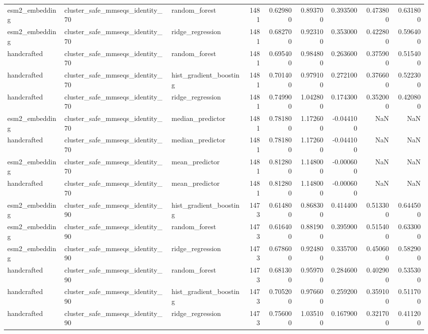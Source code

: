 \begin{longtable}{lllrrrrrr}
esm2\_embedding & cluster\_safe\_mmseqs\_identity\_70 & random\_forest & 1481 & 0.629800 & 0.893700 & 0.393500 & 0.473800 & 0.631800 \\
esm2\_embedding & cluster\_safe\_mmseqs\_identity\_70 & ridge\_regression & 1481 & 0.682700 & 0.923100 & 0.353000 & 0.422800 & 0.596400 \\
handcrafted & cluster\_safe\_mmseqs\_identity\_70 & random\_forest & 1481 & 0.695400 & 0.984800 & 0.263600 & 0.375900 & 0.515400 \\
handcrafted & cluster\_safe\_mmseqs\_identity\_70 & hist\_gradient\_boosting & 1481 & 0.701400 & 0.979100 & 0.272100 & 0.376600 & 0.522300 \\
handcrafted & cluster\_safe\_mmseqs\_identity\_70 & ridge\_regression & 1481 & 0.749900 & 1.042800 & 0.174300 & 0.352000 & 0.420800 \\
esm2\_embedding & cluster\_safe\_mmseqs\_identity\_70 & median\_predictor & 1481 & 0.781800 & 1.172600 & -0.044100 & NaN & NaN \\
handcrafted & cluster\_safe\_mmseqs\_identity\_70 & median\_predictor & 1481 & 0.781800 & 1.172600 & -0.044100 & NaN & NaN \\
esm2\_embedding & cluster\_safe\_mmseqs\_identity\_70 & mean\_predictor & 1481 & 0.812800 & 1.148000 & -0.000600 & NaN & NaN \\
handcrafted & cluster\_safe\_mmseqs\_identity\_70 & mean\_predictor & 1481 & 0.812800 & 1.148000 & -0.000600 & NaN & NaN \\
esm2\_embedding & cluster\_safe\_mmseqs\_identity\_90 & hist\_gradient\_boosting & 1473 & 0.614800 & 0.868300 & 0.414400 & 0.513300 & 0.644500 \\
esm2\_embedding & cluster\_safe\_mmseqs\_identity\_90 & random\_forest & 1473 & 0.616400 & 0.881900 & 0.395900 & 0.515400 & 0.633000 \\
esm2\_embedding & cluster\_safe\_mmseqs\_identity\_90 & ridge\_regression & 1473 & 0.678600 & 0.924800 & 0.335700 & 0.450600 & 0.582900 \\
handcrafted & cluster\_safe\_mmseqs\_identity\_90 & random\_forest & 1473 & 0.681300 & 0.959700 & 0.284600 & 0.402900 & 0.535300 \\
handcrafted & cluster\_safe\_mmseqs\_identity\_90 & hist\_gradient\_boosting & 1473 & 0.705200 & 0.976600 & 0.259200 & 0.359100 & 0.511700 \\
handcrafted & cluster\_safe\_mmseqs\_identity\_90 & ridge\_regression & 1473 & 0.756000 & 1.035100 & 0.167900 & 0.321700 & 0.411200 \\

\end{longtable}

